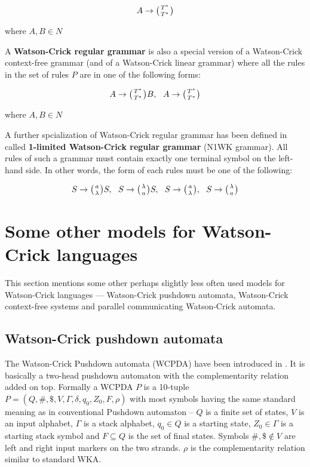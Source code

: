 $$A \rightarrow \wkpair{T^*}{T^*}$$

where $A, B \in N$

A \textbf{Watson-Crick regular grammar} is also a special version of a Watson-Crick context-free grammar (and of a Watson-Crick linear grammar) where all the rules in the set of rules $P$ are in one of the following forms:

$$A \rightarrow \wkpair{T^*}{T^*} B, \:\:\: A \rightarrow \wkpair{T^*}{T^*}$$

where $A, B \in N$

A further spcialization of Watson-Crick regular grammar has been defined in \cite{REG_GRAMMAR} called \textbf{1-limited Watson-Crick regular grammar} (N1WK grammar). All rules of such a grammar must contain exactly one terminal symbol on the left-hand side. In other words, the form of each rules must be one of the following:

$$S \rightarrow \wkpair{a}{\lambda} S, \:\:\: S \rightarrow \wkpair{\lambda}{a} S, \:\:\: S \rightarrow \wkpair{a}{\lambda}, \:\:\: S \rightarrow \wkpair{\lambda}{a}$$

\section{Some other models for Watson-Crick languages}
This section mentions some other perhaps slightly less often used models for Watson-Crick languages --- Watson-Crick pushdown automata, Watson-Crick context-free systems and parallel communicating Watson-Crick automata.

\subsection{Watson-Crick pushdown automata}
The Watson-Crick Pushdown automata (WCPDA) have been introduced in \cite{WK_PUSHDOWN_AUT}. It is basically a two-head pushdown automaton with the complementarity relation added on top. Formally a WCPDA $P$ is a 10-tuple $P = (Q, \#, \$, V, \Gamma, \delta, q_0, Z_0, F, \rho)$ with most symbols having the same standard meaning as in conventional Pushdown automaton -- $Q$ is a finite set of states, $V$ is an input alphabet, $\Gamma$ is a stack alphabet, $q_0 \in Q$ is a starting state, $Z_0 \in \Gamma$ is a starting stack symbol and $F \subseteq Q$ is the set of final states. Symbols $\#, \$ \notin V$ are left and right input markers on the two strands. $\rho$ is the complementarity relation similar to standard WKA.

